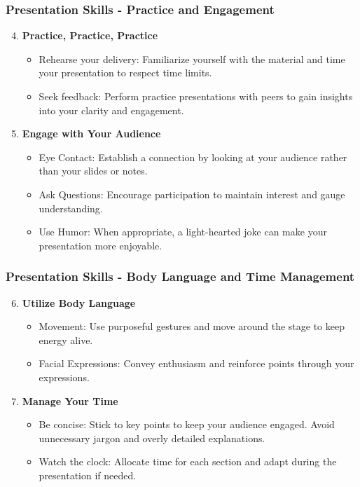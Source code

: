 \documentclass[aspectratio=169]{beamer}
\begin{document}
\begin{frame}[fragile]
    \frametitle{Presentation Skills - Practice and Engagement}
    \begin{enumerate}
        \setcounter{enumi}{3} %
        \item \textbf{Practice, Practice, Practice}
            \begin{itemize}
                \item Rehearse your delivery: Familiarize yourself with the material and time your presentation to respect time limits.
                \item Seek feedback: Perform practice presentations with peers to gain insights into your clarity and engagement.
            \end{itemize}
        \item \textbf{Engage with Your Audience}
            \begin{itemize}
                \item Eye Contact: Establish a connection by looking at your audience rather than your slides or notes.
                \item Ask Questions: Encourage participation to maintain interest and gauge understanding.
                \item Use Humor: When appropriate, a light-hearted joke can make your presentation more enjoyable.
            \end{itemize}
    \end{enumerate}
\end{frame}

\begin{frame}[fragile]
    \frametitle{Presentation Skills - Body Language and Time Management}
    \begin{enumerate}
        \setcounter{enumi}{5} %
        \item \textbf{Utilize Body Language}
            \begin{itemize}
                \item Movement: Use purposeful gestures and move around the stage to keep energy alive.
                \item Facial Expressions: Convey enthusiasm and reinforce points through your expressions.
            \end{itemize}
        \item \textbf{Manage Your Time}
            \begin{itemize}
                \item Be concise: Stick to key points to keep your audience engaged. Avoid unnecessary jargon and overly detailed explanations.
                \item Watch the clock: Allocate time for each section and adapt during the presentation if needed.
            \end{itemize}
    \end{enumerate}
\end{frame}
\end{document}
